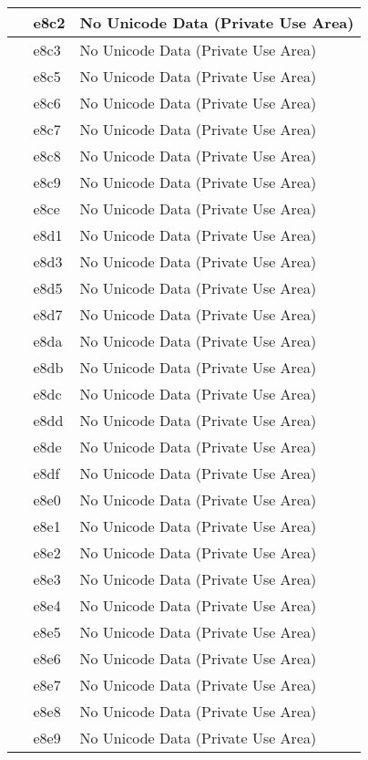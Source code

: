 \documentclass[12pt,letterpaper,openany]{book}
\begin{document}
\begin{center}
\begin{supertabular}{|m{0.25in}|m{0.5in}|m{4in}|}
 & e8c2 & No Unicode Data (Private Use Area)\\\hline
 & e8c3 & No Unicode Data (Private Use Area)\\\hline
 & e8c5 & No Unicode Data (Private Use Area)\\\hline
 & e8c6 & No Unicode Data (Private Use Area)\\\hline
 & e8c7 & No Unicode Data (Private Use Area)\\\hline
 & e8c8 & No Unicode Data (Private Use Area)\\\hline
 & e8c9 & No Unicode Data (Private Use Area)\\\hline
 & e8ce & No Unicode Data (Private Use Area)\\\hline
 & e8d1 & No Unicode Data (Private Use Area)\\\hline
 & e8d3 & No Unicode Data (Private Use Area)\\\hline
 & e8d5 & No Unicode Data (Private Use Area)\\\hline
 & e8d7 & No Unicode Data (Private Use Area)\\\hline
 & e8da & No Unicode Data (Private Use Area)\\\hline
 & e8db & No Unicode Data (Private Use Area)\\\hline
 & e8dc & No Unicode Data (Private Use Area)\\\hline
 & e8dd & No Unicode Data (Private Use Area)\\\hline
 & e8de & No Unicode Data (Private Use Area)\\\hline
 & e8df & No Unicode Data (Private Use Area)\\\hline
 & e8e0 & No Unicode Data (Private Use Area)\\\hline
 & e8e1 & No Unicode Data (Private Use Area)\\\hline
 & e8e2 & No Unicode Data (Private Use Area)\\\hline
 & e8e3 & No Unicode Data (Private Use Area)\\\hline
 & e8e4 & No Unicode Data (Private Use Area)\\\hline
 & e8e5 & No Unicode Data (Private Use Area)\\\hline
 & e8e6 & No Unicode Data (Private Use Area)\\\hline
 & e8e7 & No Unicode Data (Private Use Area)\\\hline
 & e8e8 & No Unicode Data (Private Use Area)\\\hline
 & e8e9 & No Unicode Data (Private Use Area)\\\hline

\end{supertabular}
\end{center}
\end{document}
